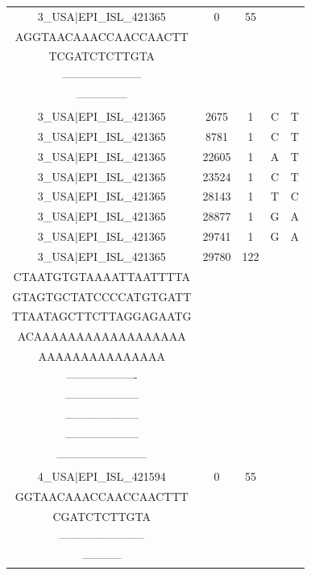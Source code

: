 \documentclass[a4paper,10pt]{article}
\begin{document}
\begin{longtable}{@{}ccccc@{}}
3\_USA|EPI\_ISL\_421365 & 0 & 55 & \begin{tabular}[c]{@{}c@{}}ATTAAAGGTTTATACCTTCCC\\ AGGTAACAAACCAACCAACTT\\ TCGATCTCTTGTA\end{tabular} & \begin{tabular}[c]{@{}c@{}}--------------------\\ ---------------------\\ --------------\end{tabular} \\* \midrule
3\_USA|EPI\_ISL\_421365 & 2675 & 1 & C & T \\* \midrule
3\_USA|EPI\_ISL\_421365 & 8781 & 1 & C & T \\* \midrule
3\_USA|EPI\_ISL\_421365 & 22605 & 1 & A & T \\* \midrule
3\_USA|EPI\_ISL\_421365 & 23524 & 1 & C & T \\* \midrule
3\_USA|EPI\_ISL\_421365 & 28143 & 1 & T & C \\* \midrule
3\_USA|EPI\_ISL\_421365 & 28877 & 1 & G & A \\* \midrule
3\_USA|EPI\_ISL\_421365 & 29741 & 1 & G & A \\* \midrule
3\_USA|EPI\_ISL\_421365 & 29780 & 122 & \begin{tabular}[c]{@{}c@{}}AGCTGCCTATATGGAAGAGCC\\ CTAATGTGTAAAATTAATTTTA\\ GTAGTGCTATCCCCATGTGATT\\ TTAATAGCTTCTTAGGAGAATG\\ ACAAAAAAAAAAAAAAAAAA\\ AAAAAAAAAAAAAAA\end{tabular} & \begin{tabular}[c]{@{}c@{}}-------------------\\ -------------------\\ --------------------\\ --------------------\\ --------------------\\ ------------------------\end{tabular} \\* \midrule
4\_USA|EPI\_ISL\_421594 & 0 & 55 & \begin{tabular}[c]{@{}c@{}}ATTAAAGGTTTATACCTTCCCA\\ GGTAACAAACCAACCAACTTT\\ CGATCTCTTGTA\end{tabular} & \begin{tabular}[c]{@{}c@{}}---------------------\\ -----------------------\\ -----------\end{tabular} \\* \midrule

\end{longtable}
\end{document}
